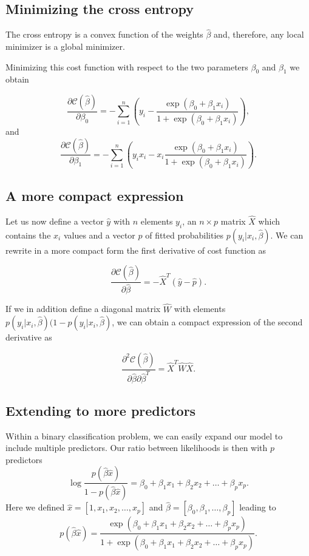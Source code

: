 \documentclass[%
oneside,                 %
final,                   %
10pt]{article}
\begin{document}
\subsection{Minimizing the cross entropy}

The cross entropy is a convex function of the weights $\hat{\beta}$ and,
therefore, any local minimizer is a global minimizer. 


Minimizing this
cost function with respect to the two parameters $\beta_0$ and $\beta_1$ we obtain

\[
\frac{\partial \mathcal{C}(\hat{\beta})}{\partial \beta_0} = -\sum_{i=1}^n  \left(y_i -\frac{\exp{(\beta_0+\beta_1x_i)}}{1+\exp{(\beta_0+\beta_1x_i)}}\right),
\]
and 
\[
\frac{\partial \mathcal{C}(\hat{\beta})}{\partial \beta_1} = -\sum_{i=1}^n  \left(y_ix_i -x_i\frac{\exp{(\beta_0+\beta_1x_i)}}{1+\exp{(\beta_0+\beta_1x_i)}}\right).
\]

\subsection{A more compact expression}

Let us now define a vector $\hat{y}$ with $n$ elements $y_i$, an
$n\times p$ matrix $\hat{X}$ which contains the $x_i$ values and a
vector $\hat{p}$ of fitted probabilities $p(y_i\vert x_i,\hat{\beta})$. We can rewrite in a more compact form the first
derivative of cost function as

\[
\frac{\partial \mathcal{C}(\hat{\beta})}{\partial \hat{\beta}} = -\hat{X}^T\left(\hat{y}-\hat{p}\right). 
\]

If we in addition define a diagonal matrix $\hat{W}$ with elements 
$p(y_i\vert x_i,\hat{\beta})(1-p(y_i\vert x_i,\hat{\beta})$, we can obtain a compact expression of the second derivative as 

\[
\frac{\partial^2 \mathcal{C}(\hat{\beta})}{\partial \hat{\beta}\partial \hat{\beta}^T} = \hat{X}^T\hat{W}\hat{X}. 
\]

\subsection{Extending to more predictors}

Within a binary classification problem, we can easily expand our model to include multiple predictors. Our ratio between likelihoods is then with $p$ predictors
\[
\log{ \frac{p(\hat{\beta}\hat{x})}{1-p(\hat{\beta}\hat{x})}} = \beta_0+\beta_1x_1+\beta_2x_2+\dots+\beta_px_p.
\]
Here we defined $\hat{x}=[1,x_1,x_2,\dots,x_p]$ and $\hat{\beta}=[\beta_0, \beta_1, \dots, \beta_p]$ leading to
\[
p(\hat{\beta}\hat{x})=\frac{ \exp{(\beta_0+\beta_1x_1+\beta_2x_2+\dots+\beta_px_p)}}{1+\exp{(\beta_0+\beta_1x_1+\beta_2x_2+\dots+\beta_px_p)}}.
\]
\end{document}
